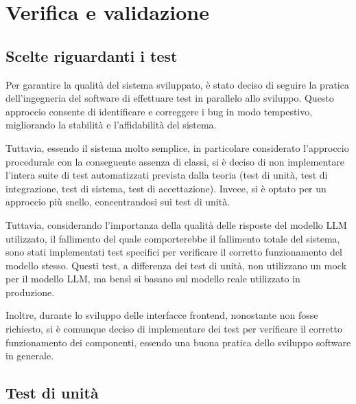 \chapter{Verifica e validazione}
\label{cap:verifica-validazione}



\section{Scelte riguardanti i test}

Per garantire la qualità del sistema sviluppato, è stato deciso di seguire la pratica dell'ingegneria del software di effettuare test in parallelo allo sviluppo. Questo approccio consente di identificare e correggere i bug in modo tempestivo, migliorando la stabilità e l'affidabilità del sistema.

Tuttavia, essendo il sistema molto semplice, in particolare considerato l'approccio procedurale con la conseguente assenza di classi, si è deciso di non implementare l'intera suite di test automatizzati prevista dalla teoria (test di unità, test di integrazione, test di sistema, test di accettazione). Invece, si è optato per un approccio più snello, concentrandosi sui test di unità.

Tuttavia, considerando l'importanza della qualità delle risposte del modello LLM utilizzato, il fallimento del quale comporterebbe il fallimento totale del sistema, sono stati implementati test specifici per verificare il corretto funzionamento del modello stesso. Questi test, a differenza dei test di unità, non utilizzano un mock per il modello LLM, ma bensì si basano sul modello reale utilizzato in produzione.

Inoltre, durante lo sviluppo delle interfacce frontend, nonostante non fosse richiesto, si è comunque deciso di implementare dei test per verificare il corretto funzionamento dei componenti, essendo una buona pratica dello sviluppo software in generale.


\section{Test di unità}

